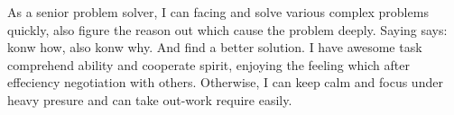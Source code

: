 

\begin{cvparagraph}
    As a senior problem solver, I can facing and solve various complex problems quickly, also figure the reason out which cause the problem deeply. Saying says: konw how, also konw why. And find a better solution.  
    I have awesome task comprehend ability and cooperate spirit, enjoying the feeling which after effeciency negotiation with others.
    Otherwise, I can keep calm and focus under heavy presure and can take out-work require easily.
\end{cvparagraph}
